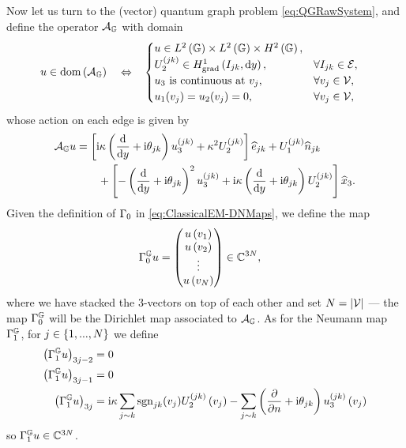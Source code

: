 Now let us turn to the (vector) quantum graph problem \eqref{eq:QGRawSystem}, and define the operator $\mathcal{A}_{\mathbb{G}}$ with domain 
\begin{align*}
	u\in\mathrm{dom}\bracs{\ag} \quad\Leftrightarrow\quad &
	\begin{cases}
	u\in L^2\bracs{\graph}\times L^2\bracs{\graph}\times H^2\bracs{\graph}, \\
	U_2^{(jk)}\in \gradSob{I_{jk}}{y}, & \forall I_{jk}\in\edgeSet, \\
	u_3 \text{ is continuous at } v_j, & \forall v_j\in\vertSet, \\
	u_1(v_j) = u_2(v_j) = 0, & \forall v_j\in\vertSet, %
	\end{cases}
\end{align*}
whose action on each edge is given by
\begin{align*}
	\mathcal{A}_{\mathbb{G}} u &= 
	\left[  \mathrm{i}\kappa\left( \dfrac{\mathrm{d}}{\mathrm{d}y} + \mathrm{i}\theta_{jk}  \right)u_3^{(jk)} + \kappa^2 U_2^{(jk)}  \right]\widehat{e}_{jk}
	+ U_1^{(jk)} \widehat{n}_{jk} \\
	&\qquad + \left[  - \left( \dfrac{\mathrm{d}}{\mathrm{d}y} + \mathrm{i}\theta_{jk}  \right)^2 u_3^{(jk)} + \mathrm{i}\kappa \left( \dfrac{\mathrm{d}}{\mathrm{d}y} + \mathrm{i}\theta_{jk}  \right)U_2^{(jk)}  \right]\widehat{x}_3.
\end{align*}
Given the definition of $\Gamma_0$ in \eqref{eq:ClassicalEM-DNMaps}, we define the map
\begin{align} \label{eq:DGMapDef}
	\Gamma_0^{\mathbb{G}} u &= 
	\begin{pmatrix}
		u\left( v_1 \right) \\ u\left( v_2 \right) \\ \vdots \\ u\left( v_N \right)
	\end{pmatrix}
	\in\mathbb{C}^{3N},
\end{align}
where we have stacked the 3-vectors on top of each other and set $N=\left\lvert \mathcal{V} \right\rvert$ --- the map $\Gamma_0^{\mathbb{G}}$ will be the Dirichlet map associated to $\mathcal{A}_{\mathbb{G}}$.
As for the Neumann map $\Gamma_1^{\mathbb{G}}$, for $j\in\left\{ 1,...,N \right\}$ we define
\begin{align} \label{eq:NGMapDef}
	\left( \Gamma_1^{\mathbb{G}} u \right)_{3j-2} &= 0 \\
	\left( \Gamma_1^{\mathbb{G}} u \right)_{3j-1} &= 0 \\
	\left( \Gamma_1^{\mathbb{G}} u \right)_{3j} &= \mathrm{i}\kappa\sum_{j\sim k} \mathrm{sgn}_{jk}(v_j) U_2^{(jk)}\left( v_j \right)
	- \sum_{j\sim k}\left( \dfrac{\partial }{\partial n} + \mathrm{i}\theta_{jk} \right)u_3^{(jk)}\left( v_j \right)
\end{align}
so $\Gamma_1^{\mathbb{G}} u\in\mathbb{C}^{3N}$.
